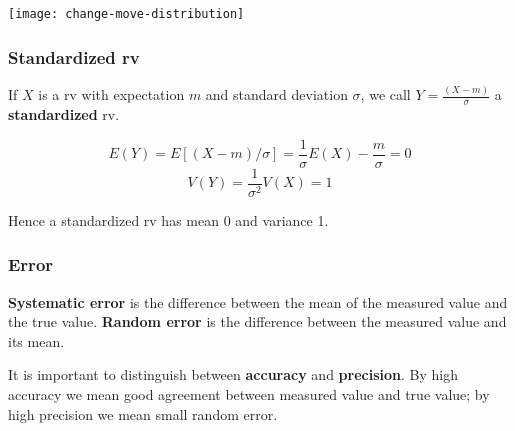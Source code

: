 \documentclass[a4paper,9pt]{extarticle}
\begin{document}
\begin{multicols*}{2}
{\centering \texttt{[image: change-move-distribution]} \par}

\subsubsection{Standardized rv}

If $X$ is a rv with expectation $m$ and standard deviation $\sigma$, we call $Y = \frac{(X - m)}{\sigma}$ a \textbf{standardized} rv.

\begin{equation}
    E(Y) = E[(X - m) / \sigma] = \frac{1}{\sigma} E(X) - \frac{m}{\sigma} = 0
\end{equation}
\begin{equation}
    V(Y) = \frac{1}{\sigma^2} V(X) = 1
\end{equation}

Hence a standardized rv has mean 0 and variance 1.

\subsubsection{Error}

\textbf{Systematic error} is the difference between the mean of the measured value and the true value. \textbf{Random error} is the difference between the measured value and its mean.

It is important to distinguish between \textbf{accuracy} and \textbf{precision}. By high accuracy we mean good agreement between measured value and true value; by high precision we mean small random error.

\end{multicols*}
\end{document}
